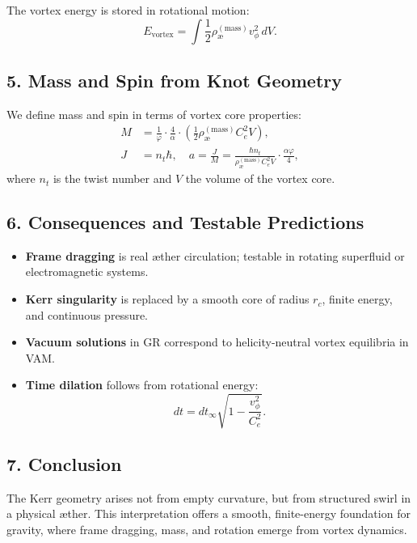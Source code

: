 \documentclass[twocolumn,aps,pre,floatfix,nofootinbib]{revtex4-2}
\begin{document}
    The vortex energy is stored in rotational motion:
    \begin{equation}
        E_{\text{vortex}} = \int \frac{1}{2} \rho_{\text{\ae}}^{(\text{mass})} v_\phi^2\, dV.
    \end{equation}

    \subsection*{5. Mass and Spin from Knot Geometry}
    We define mass and spin in terms of vortex core properties:
    \begin{align}
        M &= \frac{1}{\varphi} \cdot \frac{4}{\alpha} \cdot \left( \frac{1}{2} \rho_{\text{\ae}}^{(\text{mass})} C_e^2 V \right), \\
        J &= n_t \hbar, \quad a = \frac{J}{M} = \frac{\hbar n_t}{\rho_{\text{\ae}}^{(\text{mass})} C_e^2 V} \cdot \frac{\alpha \varphi}{4},
    \end{align}
    where \( n_t \) is the twist number and \( V \) the volume of the vortex core.

    \subsection*{6. Consequences and Testable Predictions}
    \begin{itemize}
        \item \textbf{Frame dragging} is real æther circulation; testable in rotating superfluid or electromagnetic systems.
        \item \textbf{Kerr singularity} is replaced by a smooth core of radius \( r_c \), finite energy, and continuous pressure.
        \item \textbf{Vacuum solutions} in GR correspond to helicity-neutral vortex equilibria in VAM.
        \item \textbf{Time dilation} follows from rotational energy:
        \[
            dt = dt_{\infty} \sqrt{1 - \frac{v_\phi^2}{C_e^2}}.
        \]
    \end{itemize}

    \subsection*{7. Conclusion}
    The Kerr geometry arises not from empty curvature, but from structured swirl in a physical æther. This interpretation offers a smooth, finite-energy foundation for gravity, where frame dragging, mass, and rotation emerge from vortex dynamics.
\end{document}
